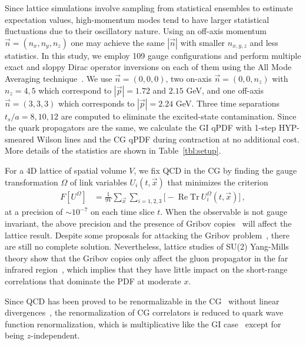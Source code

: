 \documentclass[prd,twocolumn,preprintnumbers,showpacs,nofootinbib,superscriptaddress,notitlepage,floatfix]{revtex4-1}
\DeclareMathOperator\re{Re}
\DeclareRobustCommand{\tbl}[1]{Table~\ref{tbl:#1}}
\newcommand{\Tr}{\mathrm{Tr}}
\begin{document}
Since lattice simulations involve sampling from statistical ensembles to estimate expectation values, high-momentum modes tend to have larger statistical fluctuations due to their oscillatory nature. Using an off-axis momentum $\vec{n}=(n_x,n_y,n_z)$ one may achieve the same $|\vec{n}|$ with smaller $n_{x,y,z}$ and less statistics. In this study, we employ 109 gauge configurations and perform multiple exact and sloppy Dirac operator inversions on each of them using the All Mode Averaging technique~\cite{Shintani:2014vja}. We use $\vec{n}=(0,0,0)$, two on-axis $\vec{n}=(0,0,n_z)$ with $n_z=4,5$ which correspond to $|\vec{p}|=1.72$ and $2.15$ GeV, and one off-axis $\vec{n}=(3,3,3)$ which corresponds to $|\vec{p}|=2.24$ GeV. Three time separations $t_s/a=8,10,12$ are computed to eliminate the excited-state contamination. Since the quark propagators are the same, we calculate the GI qPDF with 1-step HYP-smeared Wilson lines and the CG qPDF during contraction at no additional cost. More details of the statistics are shown in \tbl{setup}.

For a 4D lattice of spatial volume $V$, we fix QCD in the CG by finding the gauge transformation $\Omega$ of link variables $U_i(t,\vec{x})$ that minimizes the criterion~\cite{Davies:1987vs,Hudspith:2014oja}
\begin{align}
\label{eq:gribov}
  F[U^\Omega]
 & = \frac{1}{9V} \sum_{\vec{x}} \sum_{i=1,2,3} \big[-\re\Tr\ U^\Omega_i(t,\vec{x})\big]\,,
\end{align}
at a precision of $\sim10^{-7}$ on each time slice $t$.
When the observable is not gauge invariant, the above precision and the presence of Gribov copies~\cite{Gribov:1977wm,Singer:1978dk} will affect the lattice result. Despite some proposals for attacking the Gribov problem~\cite{deForcrand:1994mz,Maas:2008ri,Cooper:2015sza,Burgio:2016nad}, there are still no complete solution. Nevertheless, lattice studies of SU(2) Yang-Mills theory show that the Gribov copies only affect the gluon propagator in the far infrared region~\cite{Maas:2017csm}, which implies that they have little impact on the short-range correlations that dominate the PDF at moderate $x$.

Since QCD has been proved to be renormalizable in the CG~\cite{Zwanziger:1998ez,Baulieu:1998kx,Niegawa:2006ey} without linear divergences~\cite{Niegawa:2006hg}, the renormalization of CG correlators is reduced to quark wave function renormalization, which is multiplicative like the GI case~\cite{Ji:2017oey,Ishikawa:2017faj,Green:2017xeu} except for being $z$-independent.
\end{document}
